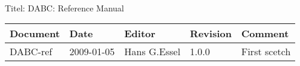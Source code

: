 \\Titel: DABC: Reference Manual
\begin{table}[h]
\begin{tabular}{|p{2.8cm}|p{2.0cm}|p{3.0cm}|p{1.6cm}|p{5.0cm}|} \hline
Document   & Date        & Editor       & Revision & Comment \\
\hline DABC-ref & 2009-01-05 & Hans G.Essel & 1.0.0      &
First scetch \\ \hline
\end{tabular}
\end{table}

